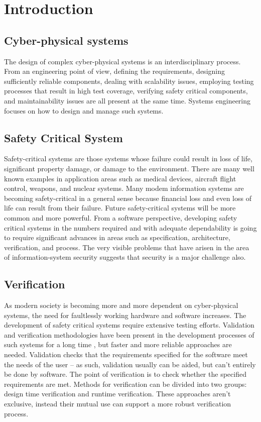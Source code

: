 \chapter{Introduction}
\label{chap:intro}

\section*{Cyber-physical systems}

The design of complex cyber-physical systems is an interdisciplinary process. From an engineering point of view, defining the requirements, designing sufficiently reliable components, dealing with scalability issues, employing testing processes that result in high test coverage, verifying safety critical components, and maintainability issues are all present at the same time. Systems engineering focuses on how to design and manage such systems. \cite{randomwikipedialink1} \cite{randomwikipedialink2}

\section*{Safety Critical System}

Safety-critical systems are those systems whose failure could result in loss of life, significant property damage, or damage to the environment. There are many well known examples in application areas such as medical devices, aircraft flight control, weapons, and nuclear systems. Many modem information systems are becoming safety-critical in a general sense because financial loss and even loss of life can result from their failure. Future safety-critical systems will be more common and more powerful. From a software perspective, developing safety critical systems in the numbers required and with adequate dependability is going to require significant advances in areas such as specification, architecture, verification, and process. The very visible problems that have arisen in the area of information-system security suggests that security is a major challenge also. \cite{safetycritical}

\section*{Verification}

As modern society is becoming more and more dependent on cyber-physical systems, the need for faultlessly working hardware and software increases. The development of safety critical systems require extensive testing efforts. Validation and verification methodologies have been present in the development processes of such systems for a long time \citep{ieee1012}, but faster and more reliable approaches are needed. Validation checks that the requirements specified for the software meet the needs of the user -- as such, validation usually can be aided, but can’t entirely be done by software. The point of verification is to check whether the specified requirements are met. Methods for verification can be divided into two groups: design time verification and runtime verification. These approaches aren't exclusive, instead their mutual use can support a more robust verification process.

